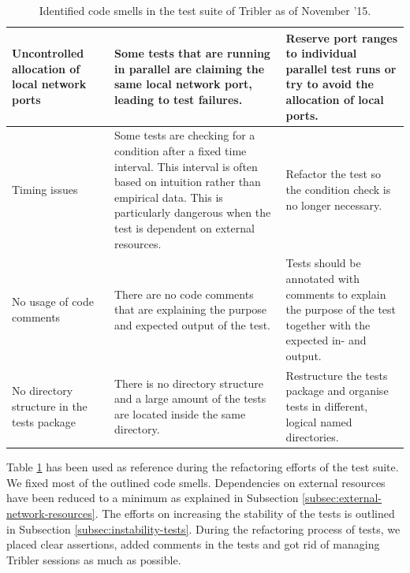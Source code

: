 \begin{table}
\begin{tabularx}{\textwidth}{|X|X|X|}
		Uncontrolled allocation of local network ports & Some tests that are running in parallel are claiming the same local network port, leading to test failures. & Reserve port ranges to individual parallel test runs or try to avoid the allocation of local ports. \\ \hline
		Timing issues & Some tests are checking for a condition after a fixed time interval. This interval is often based on intuition rather than empirical data. This is particularly dangerous when the test is dependent on external resources. & Refactor the test so the condition check is no longer necessary.\\ \hline
		No usage of code comments & There are no code comments that are explaining the purpose and expected output of the test. & Tests should be annotated with comments to explain the purpose of the test together with the expected in- and output. \\ \hline
		No directory structure in the tests package & There is no directory structure and a large amount of the tests are located inside the same directory. & Restructure the tests package and organise tests in different, logical named directories.\\ \hline
	\end{tabularx}
	\caption{Identified code smells in the test suite of Tribler as of November '15.}
	\label{table:tests-code-smells}
\end{table}

Table \ref{table:tests-code-smells} has been used as reference during the refactoring efforts of the test suite. We fixed most of the outlined code smells. Dependencies on external resources have been reduced to a minimum as explained in Subsection \ref{subsec:external-network-resources}. The efforts on increasing the stability of the tests is outlined in Subsection \ref{subsec:instability-tests}. During the refactoring process of tests, we placed clear assertions, added comments in the tests and got rid of managing Tribler sessions as much as possible.

